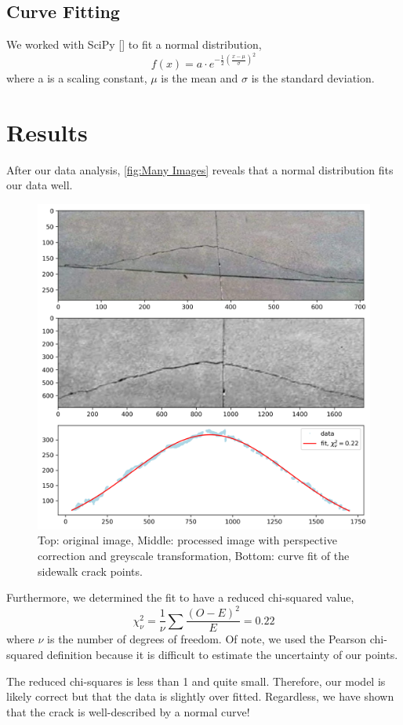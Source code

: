 \documentclass{article}
\begin{document}
\subsection{Curve Fitting}

We worked with SciPy [\cite{2020SciPy-NMeth}] to fit a normal distribution,
\begin{equation}
    f(x) = a \cdot e^{-\frac{1}{2} \left( \frac{x - \mu}{\sigma} \right)^2}
\end{equation}
where a is a scaling constant, $\mu$ is the mean and $\sigma$ is the standard deviation.

\section{Results}

After our data analysis, \autoref{fig:Many Images} reveals that a normal distribution fits our data well.

\begin{figure}[h]
    \centering
    \includegraphics[width=13cm]{fit.png}
    \caption{Top: original image, Middle: processed image with perspective correction and greyscale transformation, Bottom: curve fit of the sidewalk crack points.
}
    \label{fig:Many Images}
\end{figure}

Furthermore, we determined the fit to have a reduced chi-squared value,
\begin{equation}
    \chi^2_\nu = \frac{1}{\nu} \sum \frac{(O - E)^2}{E} = 0.22
\end{equation}
where $\nu$ is the number of degrees of freedom. Of note, we used the Pearson chi-squared definition because it
is difficult to estimate the uncertainty of our points.

The reduced chi-squares is less than 1 and quite small. Therefore, our model is likely correct but that the
data is slightly over fitted. Regardless, we have shown that the crack is well-described by a normal curve!



\nocite{*}
\end{document}

